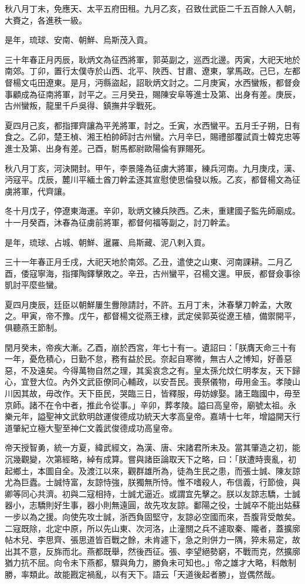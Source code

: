 \begin{pinyinscope}
秋八月丁未，免應天、太平五府田租。九月乙亥，召致仕武臣二千五百餘人入朝，大賚之，各進秩一級。

是年，琉球、安南、朝鮮、烏斯茂入貢。

三十年春正月丙辰，耿炳文為征西將軍，郭英副之，巡西北邊。丙寅，大祀天地於南郊。丁卯，置行太僕寺於山西、北平、陜西、甘肅、遼東，掌馬政。己巳，左都督楊文屯田遼東。是月，沔縣盜起，詔耿炳文討之。二月庚寅，水西蠻叛，都督僉事顧成為征南將軍，討平之。三月癸丑，賜陳安阜等進士及第、出身有差。庚辰，古州蠻叛，龍里千戶吳得、鎮撫井孚戰死。

夏四月己亥，都指揮齊讓為平羌將軍，討之。壬寅，水西蠻平。五月壬子朔，日有食之。乙卯，楚王楨、湘王柏帥師討古州蠻。六月辛巳，賜禮部覆試貢士韓克忠等進士及第、出身有差。己酉，駙馬都尉歐陽倫有罪賜死。

秋八月丁亥，河決開封。甲午，李景隆為征虜大將軍，練兵河南。九月庚戌，漢、沔寇平。戊辰，麓川平緬土酋刀幹孟逐其宣慰使思倫發以叛。乙亥，都督楊文為征虜將軍，代齊讓。

冬十月戊子，停遼東海運。辛卯，耿炳文練兵陜西。乙未，重建國子監先師廟成。十一月癸酉，沐春為征虜前將軍，都督何福等副之，討刀幹孟。

是年，琉球、占城、朝鮮、暹羅、烏斯藏、泥八剌入貢。

三十一年春正月壬戌，大祀天地於南郊。乙丑，遣使之山東、河南課耕。二月乙酉，倭寇寧海，指揮陶鐸擊敗之。辛丑，古州蠻平，召楊文還。甲辰，都督僉事徐凱討平麼些蠻。

夏四月庚辰，廷臣以朝鮮屢生釁隙請討，不許。五月丁未，沐春擊刀幹孟，大敗之。甲寅，帝不豫。戊午，都督楊文從燕王棣，武定侯郭英從遼王植，備禦開平，俱聽燕王節制。

閏月癸未，帝疾大漸。乙酉，崩於西宮，年七十有一。遺詔曰：「朕膺天命三十有一年，憂危積心，日勤不怠，務有益於民。奈起自寒微，無古人之博知，好善惡惡，不及遠矣。今得萬物自然之理，其奚哀念之有。皇太孫允炆仁明孝友，天下歸心，宜登大位。內外文武臣僚同心輔政，以安吾民。喪祭儀物，毋用金玉。孝陵山川因其故，毋改作。天下臣民，哭臨三日，皆釋服，毋妨嫁娶。諸王臨國中，毋至京師。諸不在令中者，推此令從事。」辛卯，葬孝陵。謚曰高皇帝，廟號太祖。永樂元年，謚聖神文武欽明啟運俊德成功統天大孝高皇帝。嘉靖十七年，增謚開天行道肇紀立極大聖至神仁文義武俊德成功高皇帝。

帝天授智勇，統一方夏，緯武經文，為漢、唐、宋諸君所未及。當其肇造之初，能沉幾觀變，次第經略，綽有成算。嘗與諸臣論取天下之略，曰：「朕遭時喪亂，初起鄉土，本圖自全。及渡江以來，觀群雄所為，徒為生民之患，而張士誠、陳友諒尤為巨蠹。士誠恃富，友諒恃強，朕獨無所恃。惟不嗜殺人，布信義，行節儉，與卿等同心共濟。初與二寇相持，士誠尤逼近。或謂宜先擊之。朕以友諒志驕，士誠器小，志驕則好生事，器小則無遠圓，故先攻友諒。鄱陽之役，士誠卒不能出姑蘇一步以為之援。向使先攻士誠，浙西負固堅守，友諒必空國而來，吾腹背受敵矣。二寇既除，北定中原，所以先山東、次河洛，止潼關之兵不遽取秦、隴者，蓋擴廓帖木兒、李思齊、張思道皆百戰之餘，未肯遽下，急之則併力一隅，猝未易定，故出其不意，反旆而北。燕都既舉，然後西征。張、李望絕勢窮，不戰而克，然擴廓猶力抗不屈。向令未下燕都，驟與角力，勝負未可知也。」帝之雄才大略，料敵制勝，率類此。故能戡定禍亂，以有天下。語云「天道後起者勝」，豈偶然哉。


\end{pinyinscope}
